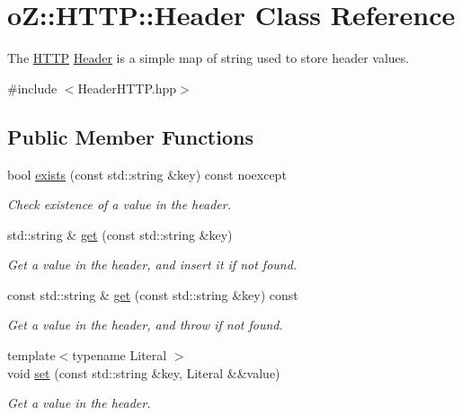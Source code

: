 \hypertarget{classo_z_1_1_h_t_t_p_1_1_header}{}\section{oZ\+::H\+T\+TP\+::Header Class Reference}
\label{classo_z_1_1_h_t_t_p_1_1_header}


The \mbox{\hyperlink{namespaceo_z_1_1_h_t_t_p}{H\+T\+TP}} \mbox{\hyperlink{classo_z_1_1_h_t_t_p_1_1_header}{Header}} is a simple map of string used to store header values.  




{\ttfamily \#include $<$Header\+H\+T\+T\+P.\+hpp$>$}

\subsection*{Public Member Functions}
\begin{DoxyCompactItemize}
\item 
bool \mbox{\hyperlink{classo_z_1_1_h_t_t_p_1_1_header_a6981daf90cda100da0e23a516991d35b}{exists}} (const std\+::string \&key) const noexcept
\begin{DoxyCompactList}\small\item\em Check existence of a value in the header. \end{DoxyCompactList}\item 
std\+::string \& \mbox{\hyperlink{classo_z_1_1_h_t_t_p_1_1_header_aeedea8bfa094294f0f5892bc9736c48e}{get}} (const std\+::string \&key)
\begin{DoxyCompactList}\small\item\em Get a value in the header, and insert it if not found. \end{DoxyCompactList}\item 
const std\+::string \& \mbox{\hyperlink{classo_z_1_1_h_t_t_p_1_1_header_acb0cba9e469ca227411584a4d5485b91}{get}} (const std\+::string \&key) const
\begin{DoxyCompactList}\small\item\em Get a value in the header, and throw if not found. \end{DoxyCompactList}\item 
{\footnotesize template$<$typename Literal $>$ }\\void \mbox{\hyperlink{classo_z_1_1_h_t_t_p_1_1_header_a00466b7e626925b15b650733bab543f6}{set}} (const std\+::string \&key, Literal \&\&value)
\begin{DoxyCompactList}\small\item\em Get a value in the header. \end{DoxyCompactList}\end{DoxyCompactItemize}


